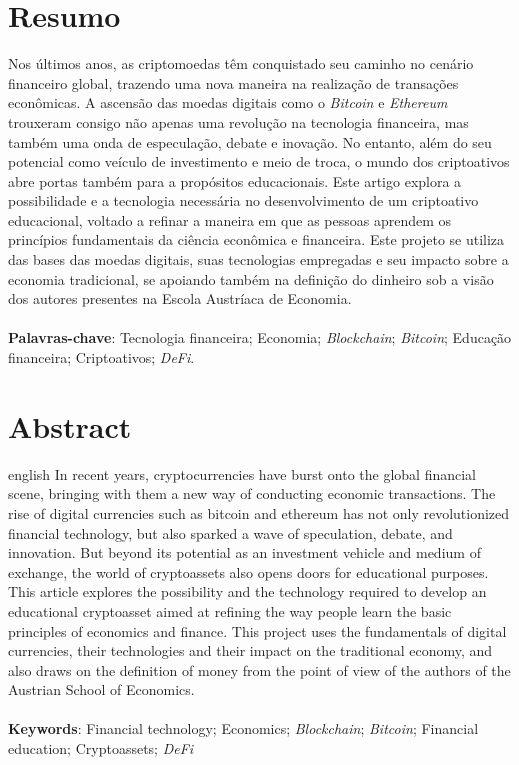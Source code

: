 \documentclass[article,12pt,oneside,a4paper,english,brazil]{unifil}
\date{}
\begin{document}
\frenchspacing
\maketitle
\normalsize

\fontsize{10}{1}\selectfont
\section*{Resumo}
Nos últimos anos, as criptomoedas têm conquistado seu caminho no cenário financeiro global, trazendo uma nova maneira na realização de transações econômicas. A ascensão das moedas digitais como o \textit{Bitcoin} e \textit{Ethereum} trouxeram consigo não apenas uma revolução na tecnologia financeira, mas também uma onda de especulação, debate e inovação. No entanto, além do seu potencial como veículo de investimento e meio de troca, o mundo dos criptoativos abre portas também para a propósitos educacionais. Este artigo explora a possibilidade e a tecnologia necessária no desenvolvimento de um criptoativo educacional, voltado a refinar a maneira em que as pessoas aprendem os princípios fundamentais da ciência econômica e financeira. Este projeto se utiliza das bases das moedas digitais, suas tecnologias empregadas e seu impacto sobre a economia tradicional, se apoiando também na definição do dinheiro sob a visão dos autores presentes na Escola Austríaca de Economia.\\
\vspace{\onelineskip} \\
\noindent
\textbf{Palavras-chave}: Tecnologia financeira; Economia; \textit{Blockchain}; \textit{Bitcoin}; Educação financeira; Criptoativos; \textit{DeFi}.


\section*{Abstract}
\begin{otherlanguage*}{english}
In recent years, cryptocurrencies have burst onto the global financial scene, bringing with them a new way of conducting economic transactions. The rise of digital currencies such as bitcoin and ethereum has not only revolutionized financial technology, but also sparked a wave of speculation, debate, and innovation. But beyond its potential as an investment vehicle and medium of exchange, the world of cryptoassets also opens doors for educational purposes. This article explores the possibility and the technology required to develop an educational cryptoasset aimed at refining the way people learn the basic principles of economics and finance. This project uses the fundamentals of digital currencies, their technologies and their impact on the traditional economy, and also draws on the definition of money from the point of view of the authors of the Austrian School of Economics.\\
\vspace{\onelineskip}\\
\noindent
\textbf{Keywords}: Financial technology; Economics; \textit{Blockchain}; \textit{Bitcoin}; Financial education; Cryptoassets; \textit{DeFi}
\end{otherlanguage*}
\end{document}
